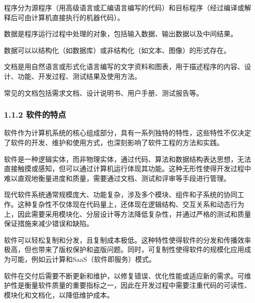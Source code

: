 程序分为源程序（用高级语言或汇编语言编写的代码）和目标程序（经过编译或解释后可由计算机直接执行的机器代码）。


数据是程序运行过程中处理的对象，包括输入数据、输出数据以及中间结果。

数据可以以结构化（如数据库）或非结构化（如文本、图像）的形式存在。


文档是用自然语言或形式化语言编写的文字资料和图表，用于描述程序的内容、设计、功能、开发过程、测试结果及使用方法。

常见的文档包括需求文档、设计说明书、用户手册、测试报告等。

\hypertarget{ux8f6fux4ef6ux7684ux7279ux70b9}{%
\subsubsection{1.1.2 软件的特点}\label{ux8f6fux4ef6ux7684ux7279ux70b9}}

软件作为计算机系统的核心组成部分，具有一系列独特的特性，这些特性不仅决定了软件的开发、维护和使用方式，也深刻影响了软件工程的方法和实践。


软件是一种逻辑实体，而非物理实体，通过代码、算法和数据结构表达思想，无法直接触摸或感知，但可以通过计算机运行体现其功能。这种无形性使得开发过程中难以直观地衡量进度和质量，需要通过文档、测试和评审等手段进行管理。


现代软件系统通常规模庞大、功能复杂，涉及多个模块、组件和子系统的协同工作。这种复杂性不仅体现在代码量上，还体现在逻辑结构、交互关系和动态行为上，因此需要采用模块化、分层设计等方法降低复杂性，并通过严格的测试和质量保证措施来减少错误和缺陷。


软件可以轻松复制和分发，且复制成本极低。这种特性使得软件的分发和传播效率极高，但也带来了版权保护和盗版问题。同时，可复制性使得软件的规模化应用成为可能，例如云计算和SaaS（软件即服务）模式。


软件在交付后需要不断更新和维护，以修复错误、优化性能或适应新的需求。可维护性是衡量软件质量的重要指标之一，因此在开发过程中需要注重代码的可读性、模块化和文档化，以降低维护成本。


